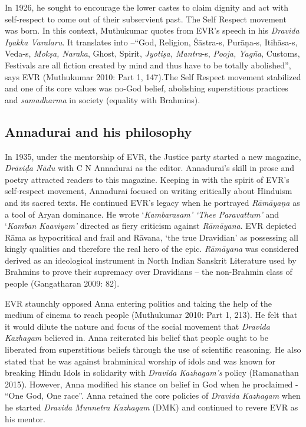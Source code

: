 In 1926, he sought to encourage the lower castes to claim dignity and act with self-respect to come out of their subservient past. The Self Respect movement was born. In this context, Muthukumar quotes from EVR’s speech in his \textit{Dravida Iyakka Varalaru}. It translates into –“God, Religion, Śāstra-s, Purāņa-s, Itihāsa-s, Veda-s, \textit{Mokṣa, Naraka}, Ghost, Spirit, \textit{Jyotiṣa, Mantra}-s,\textit{ Pooja, Yagña}, Customs, Festivals are all fiction created by mind and thus have to be totally abolished”, says EVR (Muthukumar 2010: Part 1, 147).The Self Respect movement stabilized and one of its core values was no-God belief, abolishing superstitious practices and \textit{samadharma} in society (equality with Brahmins).


\subsection*{Annadurai and his philosophy}

In 1935, under the mentorship of EVR, the Justice party started a new magazine, \textit{Drāviḍa Nādu} with C N Annadurai as the editor. Annadurai’s skill in prose and poetry attracted readers to this magazine. Keeping in with the spirit of EVR’s self-respect movement, Annadurai focused on writing critically about Hinduism and its sacred texts. He continued EVR’s legacy when he portrayed \textit{Rāmāyaņa} as a tool of Aryan dominance. He wrote ‘\textit{Kambarasam’ ‘Thee Paravattum’} and ‘\textit{Kamban Kaaviyam’} directed as fiery criticism against \textit{Rāmāyana}. EVR depicted Rāma as hypocritical and frail and Rāvana, ‘the true Dravidian’ as possessing all kingly qualities and therefore the real hero of the epic. \textit{Rāmāyana }was considered derived as an ideological instrument in North Indian Sanskrit Literature used by Brahmins to prove their supremacy over Dravidians – the non-Brahmin class of people (Gangatharan 2009: 82).

EVR staunchly opposed Anna entering politics and taking the help of the medium of cinema to reach people (Muthukumar 2010: Part 1, 213). He felt that it would dilute the nature and focus of the social movement that \textit{Dravida Kazhagam} believed in. Anna reiterated his belief that people ought to be liberated from superstitious beliefs through the use of scientific reasoning. He also stated that he was against brahminical worship of idols and was known for breaking Hindu Idols in solidarity with \textit{Dravida Kazhagam’s} policy (Ramanathan 2015). However, Anna modified his stance on belief in God when he proclaimed - “One God, One race”. Anna retained the core policies of \textit{Dravida Kazhagam} when he started \textit{Dravida Munnetra Kazhagam} (DMK) and continued to revere EVR as his mentor.


